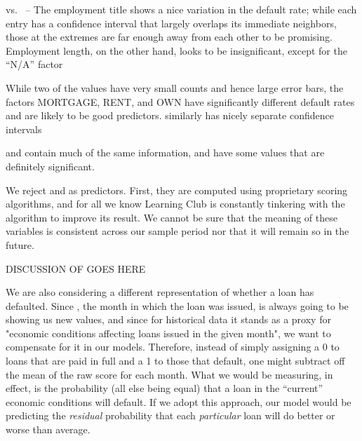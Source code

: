  vs.\  -- The employment title shows a nice variation in the default rate; while each entry has a confidence interval that largely overlaps its immediate neighbors, those at the extremes are far enough away from each other to be promising. Employment length, on the other hand, looks to be insignificant, except for the “N/A” factor

 While two of the values have very small counts and hence large error bars, the factors MORTGAGE, RENT, and OWN have significantly different default rates and are likely to be good predictors.  similarly has nicely separate confidence intervals

 and  contain much of the same information, and have some values that are definitely significant.

We reject  and  as predictors. First, they are computed using proprietary scoring algorithms, and for all we know Learning Club is constantly tinkering with the algorithm to improve its result. We cannot be sure that the meaning of these variables is consistent across our sample period nor that it will remain so in the future.


DISCUSSION OF  GOES HERE

We are also considering a different representation of whether a loan
has defaulted. Since , the month in which the loan was
issued, is always going to be showing us new values, and since for
historical data it stands as a proxy for "economic conditions
affecting loans issued in the given month", we want to compensate for
it in our models. Therefore, instead of simply assigning a 0 to loans
that are paid in full and a 1 to those that default, one might
subtract off the mean of the raw score for each month. What we would
be measuring, in effect, is the probability (all else being equal)
that a loan in the ``current'' economic conditions will default. If we
adopt this approach, our model would be predicting the {\it residual}
probability that each {\it particular} loan will do better or worse
than average.

\vfill\eject
\singlecolumn
{}


\bye
